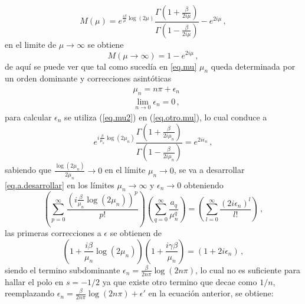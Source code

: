 \begin{equation}
M (\mu) = e ^{\frac{i \beta }{\mu} \log(2 \mu) }
\frac{\Gamma (1 + \frac{ \beta}{2 i \mu})}{\Gamma (1 - \frac{ \beta}{2 i \mu})}
- e ^{2 i \mu}
\, ,
\label{eq.otro.mu}
\end{equation}
en el limite de $\mu  \rightarrow \infty$ se obtiene
\begin{equation}
    M(\mu  \rightarrow \infty) = 
	1 - e ^{2 i \mu}
		\, ,
\end{equation}
de aquí se puede ver que tal como sucedía en \ref{eq.mu} $\mu _n$ queda determinada por un orden dominante y correcciones asintóticas
\begin{equation}
\begin{aligned}
    &\mu _n = n \pi + \epsilon _n \\[5pt]
	&\lim \limits _{n \rightarrow{0}} \epsilon _n  = 0
		\, ,
\end{aligned}
\label{eq.mu2}
\end{equation}
para calcular $\epsilon _n$ se utiliza (\ref{eq.mu2}) en (\ref{eq.otro.mu}), lo cual conduce a
\begin{equation}
	e ^{ i \frac{\beta}{ \mu _n} \log (2 \mu _n)}     
    \frac{\Gamma(1 + \frac{ \beta}{2  i \mu _n} ) }
    {\Gamma(1 -  \frac{ \beta}{2  i \mu _n} )} =    
    e ^{2 i \epsilon _n }
    	\, ,
\label{eq.a.desarrollar}
\end{equation}
sabiendo que $\frac{\log (2 \mu _n)}{2 \mu _n } \rightarrow 0$ en el límite $\mu _n \rightarrow 0$, se va a desarrollar \ref{eq.a.desarrollar} en los límites $ \mu _n \rightarrow \infty $ y $\epsilon _n \rightarrow 0$ obteniendo
\begin{equation}
    \left(
    \sum _{p = 0} ^{\infty} \frac{ \left( i \frac{\beta}{ \mu _n } \log(2 \mu _n ) \right) ^p }{p!}
    \right)
    \left(
	\sum _{q = 0} ^{\infty} \frac{a _q}{\mu _n ^q}
	\right)
    =
    \left(
    \sum _{l = 0} ^{\infty} \frac{( 2 i \epsilon _n)^l}{l !}
    \right)
    	\, ,
\end{equation}
las primeras correcciones a $\epsilon$ se obtienen de
\begin{equation}
\left( 1 + \frac{i \beta}{ \mu _n} \log ( 2 \mu _n) \right) 
\left(1 + \frac{i  \gamma \beta}{ \mu _n} \right)  =
(1 + 2 i \epsilon _n) \, ,
\end{equation}
siendo el termino subdominante $\epsilon _n =  \frac{\beta }{2 n \pi}  \log (2 n \pi)$, lo cual no es suficiente para hallar el polo en $s=-1/2$ ya que existe otro termino que decae como $1/n$, reemplazando $\epsilon _n =  \frac{\beta }{2 n \pi} \log (2 n \pi) + \epsilon '$ en la ecuación anterior, se obtiene:
